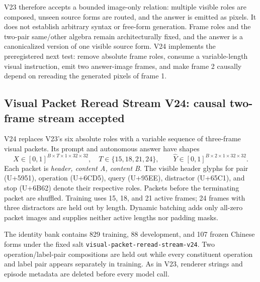 \documentclass[11pt]{article}
\begin{document}
V23 therefore accepts a bounded image-only relation: multiple visible roles
are composed, unseen source forms are routed, and the answer is emitted as
pixels. It does not establish arbitrary syntax or free-form generation. Frame
roles and the two-pair same/other algebra remain architecturally fixed, and the
answer is a canonicalized version of one visible source form. V24 implements
the preregistered next test: remove absolute frame roles, consume a
variable-length visual instruction, emit two answer-image frames, and make
frame 2 causally depend on rereading the generated pixels of frame 1.

\subsection{Visual Packet Reread Stream V24: causal two-frame stream accepted}

V24 replaces V23's six absolute roles with a variable sequence of three-frame
visual packets. Its prompt and autonomous answer have shapes
\[
X\in[0,1]^{B\times T\times1\times32\times32},
\quad T\in\{15,18,21,24\},
\qquad
\hat Y\in[0,1]^{B\times2\times1\times32\times32}.
\]
Each packet is \emph{header, content A, content B}. The visible header glyphs
for pair (U+5951), operation (U+6CD5), query (U+95EE), distractor (U+65C1),
and stop (U+6B62) denote their respective roles. Packets before the terminating
packet are shuffled. Training uses 15, 18, and 21 active frames; 24 frames with
three distractors are held out by length. Dynamic batching adds only all-zero
packet images and supplies neither active lengths nor padding masks.

The identity bank contains 829 training, 88 development, and 107 frozen
Chinese forms under the fixed salt
\texttt{visual-packet-reread-stream-v24}. Two operation/label-pair
compositions are held out while every constituent operation and label pair
appears separately in training. As in V23, renderer strings and episode
metadata are deleted before every model call.
\end{document}
